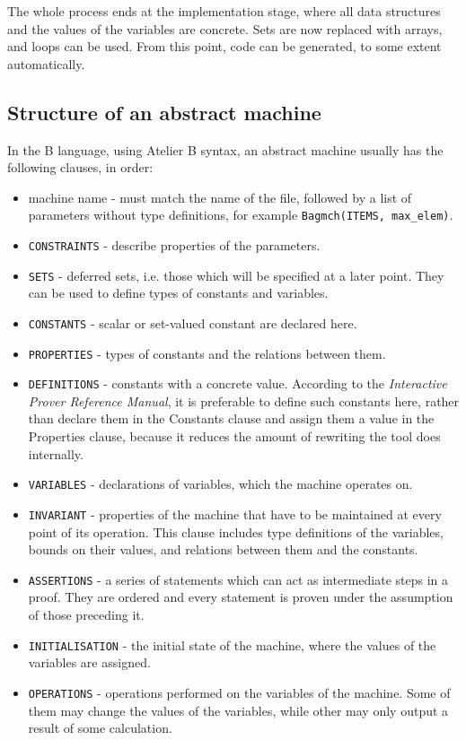 \documentclass[12pt,journal,duplex]{IEEEtran}
\begin{document}
	The whole process ends at the implementation stage, where all data structures and the values of the variables are concrete. Sets are now replaced with arrays, and loops can be used. From this point, code can be generated, to some extent automatically.

	\subsection{Structure of an abstract machine}
	In the B language, using Atelier B syntax, an abstract machine usually has the following clauses, in order:
	\begin{itemize}
		\item machine name - must match the name of the file, followed by a list of parameters without type definitions, for example \texttt{Bagmch(ITEMS, max\_elem)}.
		\item \texttt{CONSTRAINTS} - describe properties of the parameters.
		\item \texttt{SETS} - deferred sets, i.e. those which will be specified at a later point. They can be used to define types of constants and variables.
		\item \texttt{CONSTANTS} - scalar or set-valued constant are declared here.
		\item \texttt{PROPERTIES} - types of constants and the relations between them.
		\item \texttt{DEFINITIONS} - constants with a concrete value. According to the \emph{Interactive Prover Reference Manual}, it is preferable to define such constants here, rather than declare them in the Constants clause and assign them a value in the Properties clause, because it reduces the amount of rewriting the tool does internally.
		\item \texttt{VARIABLES} - declarations of variables, which the machine operates on.
		\item \texttt{INVARIANT} - properties of the machine that have to be maintained at every point of its operation. This clause includes type definitions of the variables, bounds on their values, and relations between them and the constants.
		\item \texttt{ASSERTIONS} - a series of statements which can act as intermediate steps in a proof. They are ordered and every statement is proven under the assumption of those preceding it.
		\item \texttt{INITIALISATION} - the initial state of the machine, where the values of the variables are assigned.
		\item \texttt{OPERATIONS} - operations performed on the variables of the machine. Some of them may change the values of the variables, while other may only output a result of some calculation.
	\end{itemize}
\end{document}
